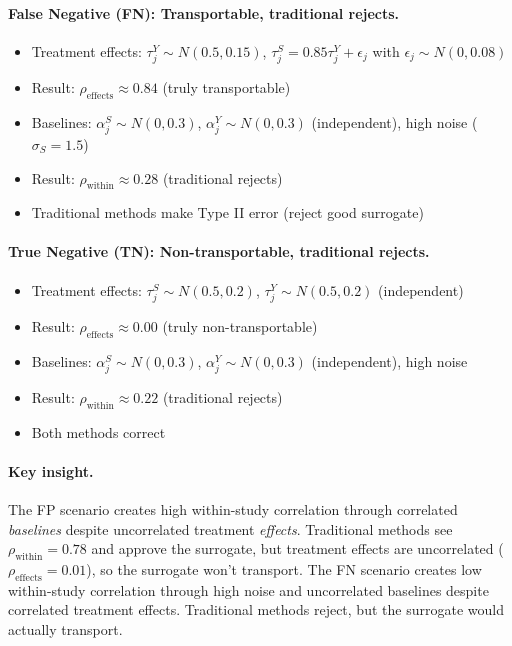 \paragraph{False Negative (FN): Transportable, traditional rejects.}
\begin{itemize}
    \item Treatment effects: $\tau_j^Y \sim N(0.5, 0.15)$, $\tau_j^S = 0.85 \tau_j^Y + \epsilon_j$ with $\epsilon_j \sim N(0, 0.08)$
    \item Result: $\rho_{\text{effects}} \approx 0.84$ (truly transportable)
    \item Baselines: $\alpha_j^S \sim N(0, 0.3)$, $\alpha_j^Y \sim N(0, 0.3)$ (independent), high noise ($\sigma_S = 1.5$)
    \item Result: $\rho_{\text{within}} \approx 0.28$ (traditional rejects)
    \item Traditional methods make Type II error (reject good surrogate)
\end{itemize}

\paragraph{True Negative (TN): Non-transportable, traditional rejects.}
\begin{itemize}
    \item Treatment effects: $\tau_j^S \sim N(0.5, 0.2)$, $\tau_j^Y \sim N(0.5, 0.2)$ (independent)
    \item Result: $\rho_{\text{effects}} \approx 0.00$ (truly non-transportable)
    \item Baselines: $\alpha_j^S \sim N(0, 0.3)$, $\alpha_j^Y \sim N(0, 0.3)$ (independent), high noise
    \item Result: $\rho_{\text{within}} \approx 0.22$ (traditional rejects)
    \item Both methods correct
\end{itemize}

\paragraph{Key insight.} The FP scenario creates high within-study correlation through correlated \emph{baselines} despite uncorrelated treatment \emph{effects}. Traditional methods see $\rho_{\text{within}} = 0.78$ and approve the surrogate, but treatment effects are uncorrelated ($\rho_{\text{effects}} = 0.01$), so the surrogate won't transport. The FN scenario creates low within-study correlation through high noise and uncorrelated baselines despite correlated treatment effects. Traditional methods reject, but the surrogate would actually transport.


